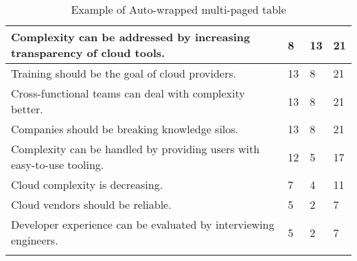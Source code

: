 \begin{longtable}{|p{10cm}|p{2cm}|p{2cm}|}
Complexity can be addressed by increasing transparency of cloud tools. & 8 & 13 & 21 \\ \hline
Training should be the goal of cloud providers. & 13 & 8 & 21 \\ \hline
Cross-functional teams can deal with complexity better. & 13 & 8 & 21 \\ \hline
Companies should be breaking knowledge silos. & 13 & 8 & 21 \\ \hline
Complexity can be handled by providing users with easy-to-use tooling. & 12 & 5 & 17 \\ \hline
Cloud complexity is decreasing. & 7 & 4 & 11 \\ \hline
Cloud vendors should be reliable. & 5 & 2 & 7 \\ \hline
Developer experience can be evaluated by interviewing engineers. & 5 & 2 & 7 \\ \hline
\caption{Example of Auto-wrapped multi-paged table}
\label{tab:table1}
\end{longtable}
